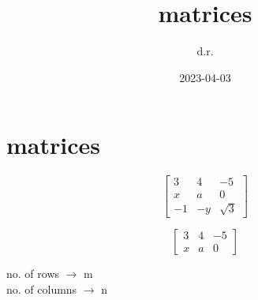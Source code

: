 \documentclass{article}
\title{matrices}
\date{2023-04-03}
\author{d.r.}
\begin{document}
\section{matrices}

\begin{multicols}{2}

\[
\begin{bmatrix}
3 & 4 & -5\\
x & a & 0\\
-1 & -y & \sqrt{3}
\end{bmatrix}
\]

\[
\begin{bmatrix}
3 & 4 & -5\\
x & a & 0
\end{bmatrix}
\]
\begin{center}
no. of rows $\to$ m \\
no. of columns $\to$ n
\end{center}
\end{multicols}
\end{document}
